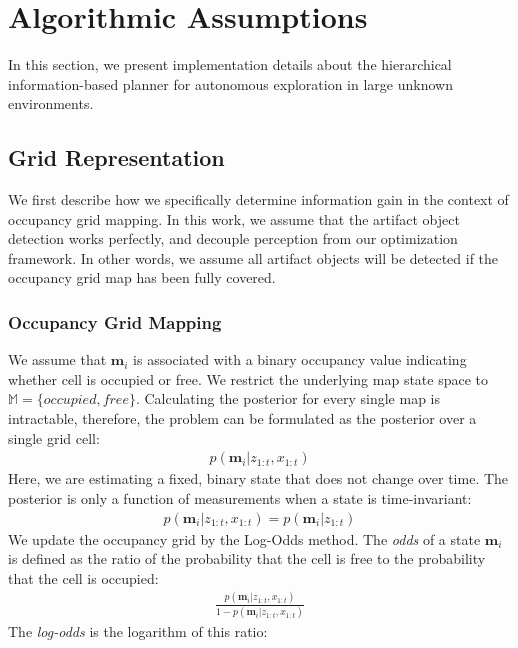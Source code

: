 \documentclass{article}
\begin{document}

\section{Algorithmic Assumptions} \label{sec:hierarchical}

In this section, we present implementation details about the hierarchical information-based planner for autonomous exploration in large unknown environments.

\subsection{Grid Representation}
We first describe how we specifically determine information gain in the context of occupancy grid mapping.  In this work, we assume that the artifact object detection works perfectly, and decouple perception from our optimization framework.
In other words, we assume all artifact objects will be detected if the occupancy grid map has been fully covered.

\subsubsection{Occupancy Grid Mapping}
We assume that $\textbf{m}_i$ is associated with a binary occupancy value indicating whether cell is occupied or free.  We restrict the underlying map state space to $\mathbb{M}=\{occupied, free\}$. Calculating the posterior for every single map is intractable, therefore, the problem can be formulated as the posterior over a single grid cell: 
\begin{align}
    p(\textbf{m}_i | z_{1:t},x_{1:t})
\end{align}
Here, we are estimating a fixed, binary state that does not change over time. The posterior is only a function of measurements when a state is time-invariant:
\begin{align}
    p(\textbf{m}_i | z_{1:t},x_{1:t}) = p(\textbf{m}_i | z_{1:t})
    \label{static}
\end{align}
We update the occupancy grid by the Log-Odds method. The \emph{odds} of a state $\textbf{m}_i$ is defined as the ratio of the probability that the cell is free to the probability that the cell is occupied:
\begin{align}
    \frac{p(\textbf{m}_i | z_{1:t},x_{1:t})}{1-p(\textbf{m}_i | z_{1:t},x_{1:t})}
    \label{odd}
\end{align}
The \emph{log-odds} is the logarithm of this ratio:
\end{document}
